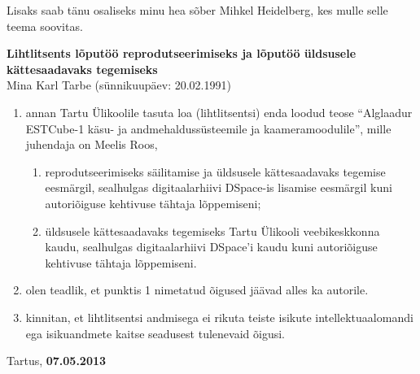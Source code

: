 \documentclass[12pt,a4paper]{article}
\begin{document}
Lisaks saab tänu osaliseks minu hea sõber Mihkel Heidelberg, kes mulle selle
teema soovitas.

\label{viited}



\pagebreak
\textbf{Lihtlitsents lõputöö reprodutseerimiseks ja lõputöö üldsusele
kättesaadavaks tegemiseks}\\

Mina Karl Tarbe (sünnikuupäev: 20.02.1991)
\begin{enumerate}
	\item
		annan Tartu Ülikoolile tasuta loa (lihtlitsentsi) enda loodud teose ``Alglaadur
		ESTCube-1 käsu- ja andmehaldussüsteemile ja kaameramoodulile'', mille juhendaja on
		Meelis Roos,
		\begin{enumerate}
			\item 
				reprodutseerimiseks säilitamise ja üldsusele kättesaadavaks
				tegemise eesmärgil, sealhulgas digitaalarhiivi DSpace-is
				lisamise eesmärgil kuni autoriõiguse kehtivuse tähtaja
				lõppemiseni;
			\item
				üldsusele kättesaadavaks tegemiseks Tartu Ülikooli
				veebikeskkonna kaudu, sealhulgas digitaalarhiivi DSpace'i kaudu
				kuni autoriõiguse kehtivuse tähtaja lõppemiseni.
		\end{enumerate}
	\item
		olen teadlik, et punktis 1 nimetatud õigused jäävad alles ka autorile.
	\item
		kinnitan, et lihtlitsentsi andmisega ei rikuta teiste isikute
		intellektuaalomandi ega isikuandmete kaitse seadusest tulenevaid õigusi.
\end{enumerate}

Tartus, \textbf{07.05.2013}
\end{document}
